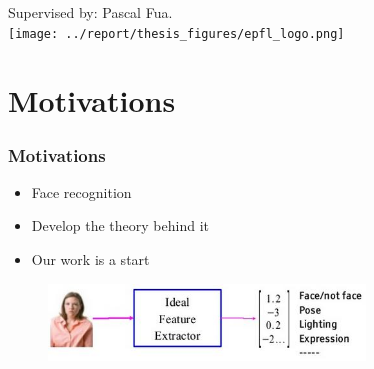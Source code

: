 \documentclass[10pt]{beamer}
\author{\docauthor}
\title{\doctitle}
\begin{document}
\begin{frame}
    \titlepage
    \begin{center}
        Supervised by: Pascal Fua.
        \\
        \vspace{0.5cm}
        \texttt{[image: ../report/thesis\_figures/epfl\_logo.png]}
    \end{center}
\end{frame}


\begin{frame}
    \tableofcontents{}
\end{frame}

\section{Motivations}
\begin{frame}
    \frametitle{Motivations}
    \begin{itemize}
        \item Face recognition
        \item Develop the theory behind it
        \item Our work is a start
    \end{itemize}

    \begin{figure}[h]
        \begin{center}
            \includegraphics[width=0.75\textwidth]{figures/lecun_face_reco.jpg}
        \end{center}
    \end{figure}
\end{frame}
\end{document}
